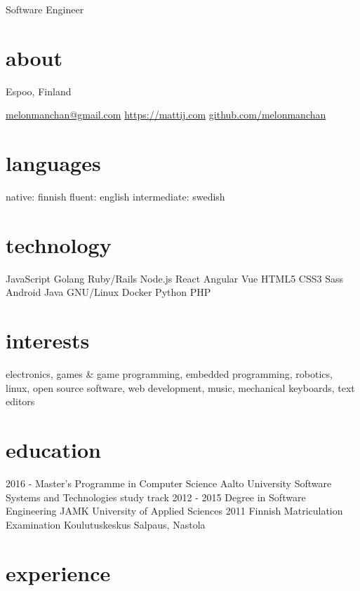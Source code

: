 \documentclass[]{friggeri-cv}
\begin{document}
       {Software Engineer}

\begin{aside}
  \section{about}
    Espoo,
    Finland
    
    \href{mailto:melonmanchan@gmail.com}{melonmanchan@gmail.com}
    \href{https://mattij.com/}{https://mattij.com}
    \href{github.com/melonmanchan}{github.com/melonmanchan}
  \section{languages}
    native: finnish
    fluent: english
    intermediate: swedish
  \section{technology}
    JavaScript
    Golang
    Ruby/Rails
    Node.js
    React
    Angular
    Vue
    HTML5
    CSS3
    Sass
    Android
    Java
    GNU/Linux
    Docker
    Python
    PHP
\end{aside}

\section{interests}

electronics, games \& game programming, embedded programming, robotics, linux, open source software, web development, music, mechanical keyboards, text editors

\section{education}

\begin{entrylist}
  \entry
    {2016 -}
    {Master's Programme in Computer Science}
    {Aalto University}
    {Software Systems and Technologies study track}
  \entry
    {2012 - 2015}
    {Degree in Software Engineering}
    {JAMK University of Applied Sciences}
    {}
  \entry
    {2011}
    {Finnish Matriculation Examination}
    {Koulutuskeskus Salpaus, Nastola}
    {}
\end{entrylist}

\section{experience}
\end{document}
